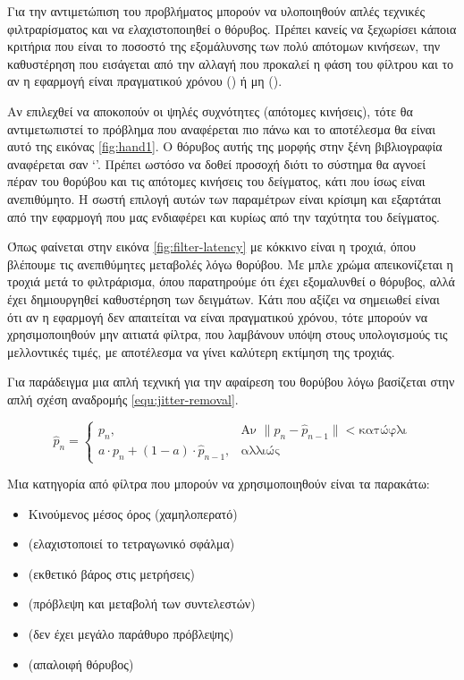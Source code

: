 Για την αντιμετώπιση του προβλήματος μπορούν να υλοποιηθούν απλές τεχνικές φιλτραρίσματος και να ελαχιστοποιηθεί ο θόρυβος. Πρέπει κανείς να ξεχωρίσει κάποια κριτήρια που είναι το ποσοστό της εξομάλυνσης των πολύ απότομων κινήσεων, την καθυστέρηση που εισάγεται από την αλλαγή που προκαλεί η φάση του φίλτρου και το αν η εφαρμογή είναι πραγματικού χρόνου () ή μη ().

Αν επιλεχθεί να αποκοπούν οι ψηλές συχνότητες (απότομες κινήσεις), τότε θα αντιμετωπιστεί το πρόβλημα που αναφέρεται πιο πάνω και το αποτέλεσμα θα είναι αυτό της εικόνας \ref{fig:hand1}. Ο θόρυβος αυτής της μορφής στην ξένη βιβλιογραφία αναφέρεται σαν \lq {}\rq . Πρέπει ωστόσο να δοθεί προσοχή διότι το σύστημα θα αγνοεί πέραν του θορύβου και τις απότομες κινήσεις του δείγματος, κάτι που ίσως είναι ανεπιθύμητο. Η σωστή επιλογή αυτών των παραμέτρων είναι κρίσιμη και εξαρτάται από την εφαρμογή που μας ενδιαφέρει και κυρίως από την ταχύτητα του δείγματος.

Όπως φαίνεται στην εικόνα \ref{fig:filter-latency} με κόκκινο είναι η τροχιά, όπου βλέπουμε τις ανεπιθύμητες μεταβολές λόγω θορύβου. Με μπλε χρώμα απεικονίζεται η τροχιά μετά το φιλτράρισμα, όπου παρατηρούμε ότι έχει εξομαλυνθεί ο θόρυβος, αλλά έχει δημιουργηθεί καθυστέρηση των δειγμάτων. Κάτι που αξίζει να σημειωθεί είναι ότι αν η εφαρμογή δεν απαιτείται να είναι πραγματικού χρόνου, τότε μπορούν να χρησιμοποιηθούν μην αιτιατά φίλτρα, που λαμβάνουν υπόψη στους υπολογισμούς τις μελλοντικές τιμές, με αποτέλεσμα να γίνει καλύτερη εκτίμηση της τροχιάς.

Για παράδειγμα μια απλή τεχνική για την αφαίρεση του θορύβου λόγω  βασίζεται στην απλή σχέση αναδρομής \ref{equ:jitter-removal}.

\begin{equation}
    \hat{p}_{n} =
    \begin{cases}
        p_{n}, & \text{Αν } \|p_{n} - \hat{p}_{n-1}\| < \text{κατώφλι} \\
        a \cdot p_{n} + (1-a) \cdot \hat{p}_{n-1}, & \text{αλλιώς}
    \end{cases}
    \label{equ:jitter-removal}
\end{equation}

Μια κατηγορία από φίλτρα που μπορούν να χρησιμοποιηθούν είναι τα παρακάτω:

\begin{itemize}
    \item Κινούμενος μέσος όρος (χαμηλοπερατό)
    \item {} (ελαχιστοποιεί το τετραγωνικό σφάλμα)
    \item {} (εκθετικό βάρος στις μετρήσεις)
    \item {} (πρόβλεψη και μεταβολή των συντελεστών)
    \item {} (δεν έχει μεγάλο παράθυρο πρόβλεψης)
    \item {} (απαλοιφή θόρυβος)
\end{itemize}

